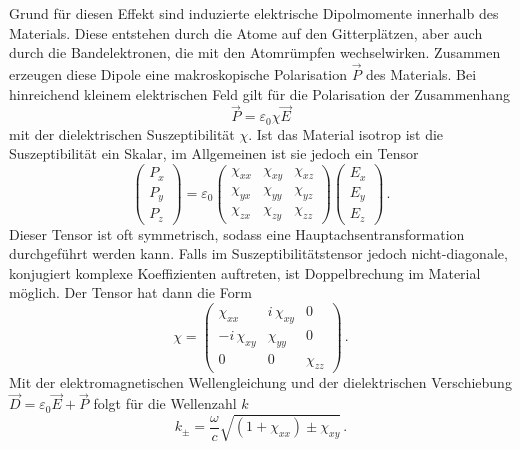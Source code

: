 Grund für diesen Effekt sind induzierte elektrische Dipolmomente innerhalb des Materials. Diese entstehen durch die Atome
auf den Gitterplätzen, aber auch durch die Bandelektronen, die mit den Atomrümpfen wechselwirken. Zusammen erzeugen diese
Dipole eine makroskopische Polarisation $\vec{P}$ des Materials. Bei hinreichend kleinem elektrischen Feld gilt für die 
Polarisation der Zusammenhang
\begin{equation}
    \label{eq:Pol}
    \vec{P} = \varepsilon_0 \chi \vec{E}
\end{equation}
mit der dielektrischen Suszeptibilität $\chi$. Ist das Material isotrop ist die Suszeptibilität ein Skalar, im Allgemeinen
ist sie jedoch ein Tensor
\begin{equation*}
    \begin{pmatrix}
        P_x \\
        P_y \\
        P_z
    \end{pmatrix}
    = \varepsilon_0 \begin{pmatrix}
        \chi_{xx} & \chi_{xy} & \chi_{xz} \\
        \chi_{yx} & \chi_{yy} & \chi_{yz} \\
        \chi_{zx} & \chi_{zy} & \chi_{zz}
    \end{pmatrix}
    \begin{pmatrix}
        E_x \\
        E_y \\
        E_z 
    \end{pmatrix} \, .
\end{equation*}
Dieser Tensor ist oft symmetrisch, sodass eine Hauptachsentransformation durchgeführt werden kann. Falls im Suszeptibilitätstensor
jedoch nicht-diagonale, konjugiert komplexe Koeffizienten auftreten, ist Doppelbrechung im Material möglich.
Der Tensor hat dann die Form 
\begin{equation}
    \label{eq:tensor}
    \chi
    = \begin{pmatrix}
        \chi_{xx} & i \, \chi_{xy} & 0 \\
        - i \, \chi_{xy} & \chi_{yy} & 0 \\
        0 & 0 & \chi_{zz}
    \end{pmatrix} \, .
\end{equation}
Mit der elektromagnetischen Wellengleichung und der dielektrischen Verschiebung $\vec{D} = \varepsilon_0 \vec{E} + \vec{P}$
folgt für die Wellenzahl $k$
\begin{equation*}
    k_{\pm} = \frac{\omega}{c} \sqrt{\left(1 + \chi_{xx} \right) \pm \chi_{xy}} \, .
\end{equation*}
